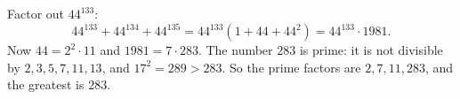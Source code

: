Factor out $44^{133}$:
\[
44^{133}+44^{134}+44^{135}=44^{133}\left(1+44+44^2\right)=44^{133}\cdot1981 .
\]
Now $44=2^2\cdot11$ and $1981=7\cdot283$. The number $283$ is prime: it is not divisible by $2,3,5,7,11,13$, and $17^2=289>283$. So the prime factors are $2,7,11,283$, and the greatest is $\boxed{283}$.
